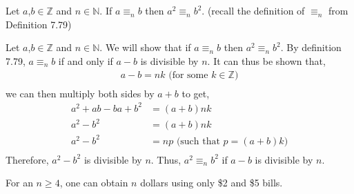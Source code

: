 \documentclass[12pt]{article}
\newenvironment{theorem}[2][Theorem]{\begin{trivlist}
\item[\hskip \labelsep {\bfseries #1}\hskip \labelsep {\bfseries #2.}]}{\end{trivlist}}
\begin{document}
\section{}
\begin{theorem}{4 (complete but seems wrong)}
	Let $a$,$b \in \mathbb{Z}$ and $n \in \mathbb{N}$. If $a \equiv_n b$ then $a^2 \equiv_n b^2$. (recall the definition of $\equiv_n$ from Definition 7.79)

	Let $a$,$b \in \mathbb{Z}$ and $n \in \mathbb{N}$. We will show that if $a \equiv_n b$ then $a^2 \equiv_n b^2$.
	By definition 7.79, $a \equiv_n b$ if and only if $a-b$ is divisible by $n$. It can thus be shown that,
	\begin{align*}
		a-b=nk \text{ (for some $k \in \mathbb{Z}$)}\\
	\end{align*}
	we can then multiply both sides by $a+b$ to get,
	\begin{align*}
		a^2+ab-ba+b^2&=(a+b)nk\\
		a^2-b^2&=(a+b)nk\\
		a^2-b^2&=np \text{ (such that $p=(a+b)k$)}\\
	\end{align*}
	Therefore, $a^2-b^2$ is divisible by $n$. 
	Thus, $a^2 \equiv_n b^2$ if $a-b$ is divisible by $n$.

\end{theorem}
\begin{theorem}5
	For an $n \geq 4$, one can obtain $n$ dollars using only \$2 and \$5 bills.
\end{theorem}
\end{document}
